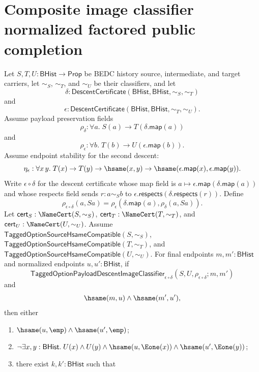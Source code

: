 \section{Composite image classifier normalized factored public completion}
\label{sec:option-composite-image-classifier-normalized-factored-public-completion}

\begin{theorem}
\label{thm:tagged-option-composite-image-classifier-normalized-factored-public-readback-completion}
Let $S,T,U:\mathsf{BHist}\to\mathsf{Prop}$ be BEDC history source,
intermediate, and target carriers, let $\sim_S$, $\sim_T$, and $\sim_U$ be their
classifiers, and let
$$
\delta:\mathsf{DescentCertificate}(\mathsf{BHist},\mathsf{BHist},\sim_S,\sim_T)
$$
and
$$
\epsilon:\mathsf{DescentCertificate}(\mathsf{BHist},\mathsf{BHist},\sim_T,\sim_U).
$$
Assume payload preservation fields
$$
\rho_{\delta}:\forall a.\;S(a)\to T(\delta.\mathsf{map}(a))
$$
and
$$
\rho_{\epsilon}:\forall b.\;T(b)\to U(\epsilon.\mathsf{map}(b)).
$$
Assume endpoint stability for the second descent:
$$
\eta_{\epsilon}:\forall x\,y.\;
T(x)\to T(y)\to \hsame(x,y)\to
\hsame(\epsilon.\mathsf{map}(x),\epsilon.\mathsf{map}(y)).
$$
Write $\epsilon\circ\delta$ for the descent certificate whose map field is
$a\mapsto\epsilon.\mathsf{map}(\delta.\mathsf{map}(a))$ and whose respects field
sends $r:a\sim_S b$ to
$\epsilon.\mathsf{respects}(\delta.\mathsf{respects}(r))$. Define
$$
\rho_{\epsilon\circ\delta}(a,Sa)=
\rho_{\epsilon}(\delta.\mathsf{map}(a),\rho_{\delta}(a,Sa)).
$$
Let $\mathsf{cert}_S:\NameCert(S,\sim_S)$,
$\mathsf{cert}_T:\NameCert(T,\sim_T)$, and
$\mathsf{cert}_U:\NameCert(U,\sim_U)$. Assume
$\mathsf{TaggedOptionSourceHsameCompatible}(S,\sim_S)$,
$\mathsf{TaggedOptionSourceHsameCompatible}(T,\sim_T)$, and
$\mathsf{TaggedOptionSourceHsameCompatible}(U,\sim_U)$. For final endpoints
$m,m':\mathsf{BHist}$ and normalized endpoints $u,u':\mathsf{BHist}$, if
$$
\mathsf{TaggedOptionPayloadDescentImageClassifier}_{\epsilon\circ\delta}
(S,U,\rho_{\epsilon\circ\delta};m,m')
$$
and
$$
\hsame(m,u)\land \hsame(m',u'),
$$
then either
\begin{enumerate}
\item $\hsame(u,\emp)\land \hsame(u',\emp)$;
\item $\neg\exists x,y:\mathsf{BHist}.\;
U(x)\land U(y)\land
\hsame(u,\Eone(x))\land
\hsame(u',\Eone(y))$;
\item there exist $k,k':\mathsf{BHist}$ such that

\end{enumerate}
\end{theorem}
